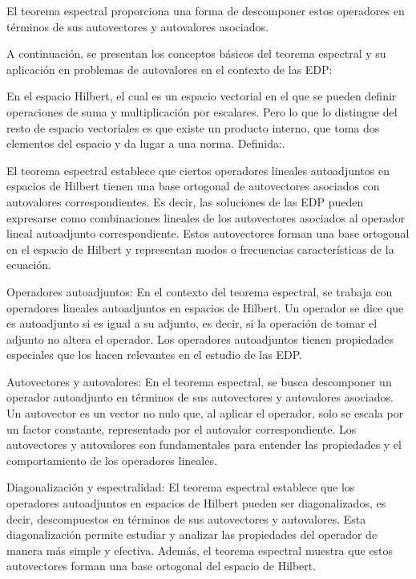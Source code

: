 \documentclass{article}
\begin{document}
    El teorema espectral proporciona una forma de descomponer estos operadores en términos de sus autovectores y autovalores asociados.

    A continuación, se presentan los conceptos básicos del teorema espectral y su aplicación en problemas de autovalores en el contexto de las EDP:

    En el espacio Hilbert, el cual es un espacio vectorial en el que se pueden definir operaciones de suma y multiplicación por escalares. Pero lo que lo distingue del resto de espacio vectoriales es que existe un producto interno, que toma dos elementos del espacio y da lugar a una norma. Definida:.

    El teorema espectral establece que ciertos operadores lineales autoadjuntos en espacios de Hilbert tienen una base ortogonal de autovectores asociados con autovalores correspondientes.
    Es decir, las soluciones de las EDP pueden expresarse como combinaciones lineales de los autovectores asociados al operador lineal autoadjunto correspondiente. Estos autovectores forman una base ortogonal en el espacio de Hilbert y representan modos o frecuencias características de la ecuación.
        
    Operadores autoadjuntos: En el contexto del teorema espectral, se trabaja con operadores lineales autoadjuntos en espacios de Hilbert. Un operador se dice que es autoadjunto si es igual a su adjunto, es decir, si la operación de tomar el adjunto no altera el operador. Los operadores autoadjuntos tienen propiedades especiales que los hacen relevantes en el estudio de las EDP.

    Autovectores y autovalores: En el teorema espectral, se busca descomponer un operador autoadjunto en términos de sus autovectores y autovalores asociados. Un autovector es un vector no nulo que, al aplicar el operador, solo se escala por un factor constante, representado por el autovalor correspondiente. Los autovectores y autovalores son fundamentales para entender las propiedades y el comportamiento de los operadores lineales.

    Diagonalización y espectralidad: El teorema espectral establece que los operadores autoadjuntos en espacios de Hilbert pueden ser diagonalizados, es decir, descompuestos en términos de sus autovectores y autovalores. Esta diagonalización permite estudiar y analizar las propiedades del operador de manera más simple y efectiva. Además, el teorema espectral muestra que estos autovectores forman una base ortogonal del espacio de Hilbert.
\end{document}
